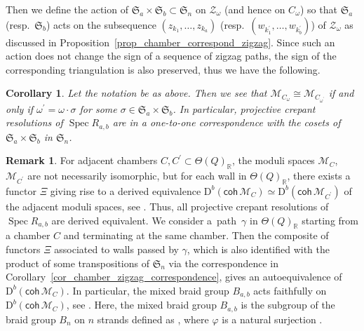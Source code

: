 \documentclass[10pt,a4paper]{amsart}
\numberwithin{equation}{section}
\newtheorem{Corollary}[Theorem]{Corollary}
\theoremstyle{definition}
\newtheorem{Remark}[Theorem]{Remark}
\newcommand{\RR}{\mathbb{R}}
\newcommand{\calM}{\mathcal{M}}
\newcommand{\calZ}{\mathcal{Z}}
\newcommand{\rmD}{\mathrm{D}}
\newcommand{\fkS}{\mathfrak{S}}
\newcommand{\Spec}{\operatorname{Spec}}
\newcommand{\permII}{\omega}
\begin{document}
Then we define the action of $\fkS_a\times \fkS_b\subset \fkS_n$ on $\calZ_\permII$ (and hence on $C_\permII$) so that
$\fkS_a$ (resp.\ $\fkS_b$) acts on the subsequence $(z_{k_1},\dots, z_{k_a})$ (resp.\ $(w_{k^\prime_1}, \dots, w_{k^\prime_b})$) of $\calZ_\permII$
as discussed in Proposition~\ref{prop_chamber_correspond_zigzag}.
Since such an action does not change the sign of a sequence of zigzag paths, the sign of the corresponding triangulation is also preserved,
thus we have the following.

\begin{Corollary}
\label{cor_isomclass_chambers}
Let the notation be as above. Then we see that
$\calM_{C_\permII}\cong\calM_{C_{\permII^\prime}}$ if and only if $\permII^\prime=\permII\cdot\sigma$ for some $\sigma \in\fkS_a\times\fkS_b$.
In particular, projective crepant resolutions of $\Spec R_{a,b}$ are in a one-to-one correspondence with the cosets of $\fkS_a\times\fkS_b$ in $\fkS_n$.
\end{Corollary}

\begin{Remark}
For adjacent chambers $C, C^\prime \subset\Theta(Q)_\RR$, the moduli spaces $\calM_C$, $\calM_{C^\prime}$ are not necessarily isomorphic,
but for each wall in $\Theta(Q)_\RR$, there exists a functor $\Xi$ giving rise to a derived equivalence $\rmD^b(\mathsf{coh}\,\calM_C)\simeq \rmD^b(\mathsf{coh}\,\calM_{C^\prime})$ of the adjacent moduli spaces, see \cite[Theorem~11.1]{IU_anycrepant}.
Thus, all projective crepant resolutions of $\Spec R_{a,b}$ are derived equivalent.
We consider a~path~$\gamma$ in $\Theta(Q)_\RR$ starting from a chamber $C$ and terminating at the same chamber.
Then the composite of functors $\Xi$ associated to walls passed by $\gamma$, which is also identified with the product of some transpositions
of $\fkS_n$ via the correspondence in Corollary~\ref{cor_chamber_zigzag_correspondence}, gives an autoequivalence of $\rmD^b(\mathsf{coh}\,\calM_C)$.
In particular, the mixed braid group $B_{a,b}$ acts faithfully on $\rmD^b(\mathsf{coh}\,\calM_C)$, see \cite[Theorem~1]{DS_mixed}.
Here, the mixed braid group $B_{a,b}$ is the subgroup of the braid group $B_n$ on $n$ strands defined as \smash{$\varphi^{-1}(\fkS_a\times\fkS_b)$},
where $\varphi$ is a natural surjection \smash{$B_n\xrightarrow{\varphi} \fkS_n$}.
\end{Remark}
\end{document}
